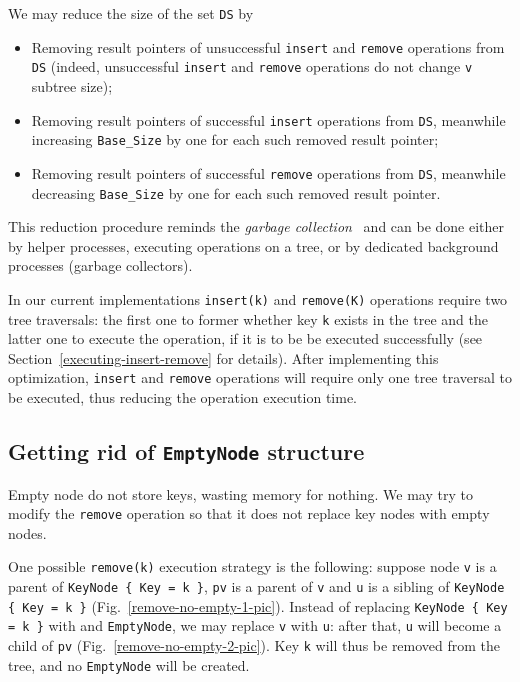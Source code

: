 \documentclass[times, dvipsnames,%
               languages={russian,english} %
              ]{itmo-student-thesis}
\begin{document}
\bigbreak

We may reduce the size of the set \texttt{DS} by

\begin{itemize}
    \item Removing result pointers of unsuccessful \texttt{insert} and \texttt{remove} operations from \texttt{DS} (indeed, unsuccessful \texttt{insert} and \texttt{remove} operations do not change \texttt{v} subtree size);
    
    \item Removing result pointers of successful \texttt{insert} operations from \texttt{DS}, meanwhile increasing \texttt{Base\_Size} by one for each such removed result pointer;
    
    \item Removing result pointers of successful \texttt{remove} operations from \texttt{DS}, meanwhile decreasing \texttt{Base\_Size} by one for each such removed result pointer.
\end{itemize}

\bigbreak

This reduction procedure reminds the \emph{garbage collection}~\cite{jones2016garbage} and can be done either by helper processes, executing operations on a tree, or by dedicated background processes (garbage collectors).

In our current implementations \texttt{insert(k)} and \texttt{remove(K)} operations require two tree traversals: the first one to former whether key \texttt{k} exists in the tree and the latter one to execute the operation, if it is to be be executed successfully (see Section~\ref{executing-insert-remove} for details). After implementing this optimization, \texttt{insert} and \texttt{remove} operations will require only one tree traversal to be executed, thus reducing the operation execution time.

\subsection{Getting rid of \texttt{EmptyNode} structure}

Empty node do not store keys, wasting memory for nothing. We may try to modify the \texttt{remove} operation so that it does not replace key nodes with empty nodes. 

One possible \texttt{remove(k)} execution strategy is the following: suppose node \texttt{v} is a parent of \texttt{KeyNode \{ Key = k \}}, \texttt{pv} is a parent of \texttt{v} and \texttt{u} is a sibling of \texttt{KeyNode \{ Key = k \}} (Fig.~\ref{remove-no-empty-1-pic}). Instead of replacing \texttt{KeyNode \{ Key = k \}} with and \texttt{EmptyNode}, we may replace \texttt{v} with \texttt{u}: after that, \texttt{u} will become a child of \texttt{pv} (Fig.~\ref{remove-no-empty-2-pic}). Key \texttt{k} will thus be removed from the tree, and no \texttt{EmptyNode} will be created.
\end{document}
